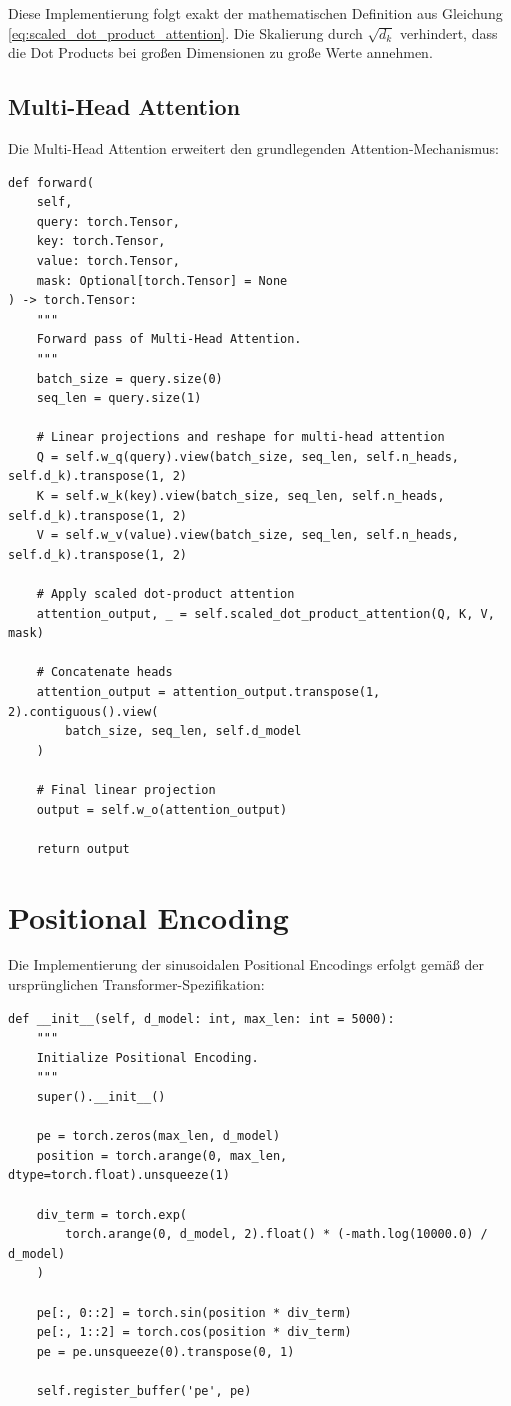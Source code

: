 Diese Implementierung folgt exakt der mathematischen Definition aus Gleichung \ref{eq:scaled_dot_product_attention}. Die Skalierung durch $\sqrt{d_k}$ verhindert, dass die Dot Products bei großen Dimensionen zu große Werte annehmen.

\subsection{Multi-Head Attention}

Die Multi-Head Attention erweitert den grundlegenden Attention-Mechanismus:

\begin{lstlisting}[style=pythonstyle, caption=Multi-Head Attention Implementierung]
def forward(
    self, 
    query: torch.Tensor, 
    key: torch.Tensor, 
    value: torch.Tensor, 
    mask: Optional[torch.Tensor] = None
) -> torch.Tensor:
    """
    Forward pass of Multi-Head Attention.
    """
    batch_size = query.size(0)
    seq_len = query.size(1)
    
    # Linear projections and reshape for multi-head attention
    Q = self.w_q(query).view(batch_size, seq_len, self.n_heads, self.d_k).transpose(1, 2)
    K = self.w_k(key).view(batch_size, seq_len, self.n_heads, self.d_k).transpose(1, 2)
    V = self.w_v(value).view(batch_size, seq_len, self.n_heads, self.d_k).transpose(1, 2)
    
    # Apply scaled dot-product attention
    attention_output, _ = self.scaled_dot_product_attention(Q, K, V, mask)
    
    # Concatenate heads
    attention_output = attention_output.transpose(1, 2).contiguous().view(
        batch_size, seq_len, self.d_model
    )
    
    # Final linear projection
    output = self.w_o(attention_output)
    
    return output
\end{lstlisting}

\section{Positional Encoding}

Die Implementierung der sinusoidalen Positional Encodings erfolgt gemäß der ursprünglichen Transformer-Spezifikation:

\begin{lstlisting}[style=pythonstyle, caption=Positional Encoding Implementierung]
def __init__(self, d_model: int, max_len: int = 5000):
    """
    Initialize Positional Encoding.
    """
    super().__init__()
    
    pe = torch.zeros(max_len, d_model)
    position = torch.arange(0, max_len, dtype=torch.float).unsqueeze(1)
    
    div_term = torch.exp(
        torch.arange(0, d_model, 2).float() * (-math.log(10000.0) / d_model)
    )
    
    pe[:, 0::2] = torch.sin(position * div_term)
    pe[:, 1::2] = torch.cos(position * div_term)
    pe = pe.unsqueeze(0).transpose(0, 1)
    
    self.register_buffer('pe', pe)
\end{lstlisting}

